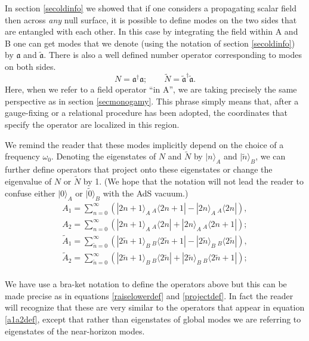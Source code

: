 \documentclass[12pt]{article}
\newcommand{\be}{\begin{equation}}
\newcommand{\ee}{\end{equation}}
\def \anh {\mathfrak{a}}
\def \tildanh {\widetilde{\mathfrak{a}}}
\begin{document}
 In section \ref{secoldinfo} we showed that if one considers a propagating scalar field then across {\em any} null surface, it is possible to define modes on the two sides that are entangled with each other. In this case by integrating the field within A and B one can get modes that we denote (using the notation of section \ref{secoldinfo}) by $\anh$ and $\tildanh$. There is also a well defined number operator corresponding to modes on both sides.
\be
N = \anh^{\dagger} \anh; \qquad \tilde{N} = \tildanh^{\dagger} \tildanh.
\ee
Here, when we refer to a field operator ``in A'', we are taking precisely the same perspective as in section \ref{secmonogamy}. This phrase simply means that, after a gauge-fixing or a relational procedure has been adopted, the coordinates that specify the operator are localized in this region.

We remind the reader that these modes implicitly depend on the choice of a frequency $\omega_0$. Denoting the eigenstates of $N$ and $\widetilde{N}$ by $|n \rangle_{A}$ and $|\tilde{n} \rangle_{B}$, 
we can further define operators that project onto these eigenstates or change the eigenvalue of $N$ or $\widetilde{N}$ by 1. (We hope that the notation will not lead the reader to confuse either $|0 \rangle_{A}$ or $|\widetilde{0} \rangle_{B}$ with the AdS vacuum.)
\be
\label{a1a2deftoymodel}
\begin{split}
A_1 = \sum_{n=0}^{\infty} \left( |2 n + 1 \rangle_{A} \, _{A}\langle 2 n + 1| - |2 n \rangle_{A} \, _{A}\langle 2 n| \right), \\
A_2 = \sum_{n=0}^{\infty} \left( |2 n + 1 \rangle_{A} \, _{A}\langle 2 n| +  |2 n \rangle_{A} \, _{A}\langle 2 n + 1| \right); \\
\widetilde{A}_1 = \sum_{\widetilde{n}=0}^{\infty} \left( |2 \widetilde{n} + 1 \rangle_{B} \, _{B}\langle 2 \widetilde{n} + 1| - |2 \widetilde{n} \rangle_{B} \, _{B}\langle 2 \widetilde{n}| \right), \\
\widetilde{A}_2 = \sum_{\widetilde{n}=0}^{\infty} \left( |2 \widetilde{n} + 1 \rangle_{B} \, _{B}\langle 2 \widetilde{n}| +  |2 \widetilde{n} \rangle_{B} \, _{B}\langle 2 \widetilde{n} + 1| \right); \\
\end{split}
\ee

We have use a bra-ket notation to define the operators above but this can be made precise as in equations \eqref{raiselowerdef} and \eqref{projectdef}. In fact the reader will recognize that these are very similar to the operators that appear in equation \eqref{a1a2def},  except that rather than eigenstates of global modes we are referring to eigenstates of the near-horizon modes.
\end{document}
